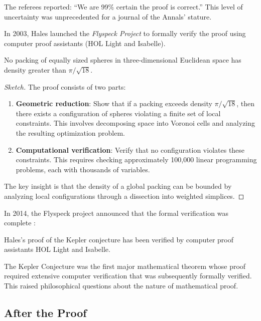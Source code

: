 The referees reported: ``We are 99\% certain the proof is correct.'' This level of uncertainty was unprecedented for a journal of the Annals' stature.

In 2003, Hales launched the \emph{Flyspeck Project} to formally verify the proof using computer proof assistants (HOL Light and Isabelle). 

\begin{theorem}
No packing of equally sized spheres in three-dimensional Euclidean space has density greater than $\pi/\sqrt{18}$.
\end{theorem}

\begin{proof}[Sketch]
The proof consists of two parts:
\begin{enumerate}
\item \textbf{Geometric reduction}: Show that if a packing exceeds density $\pi/\sqrt{18}$, then there exists a configuration of spheres violating a finite set of local constraints. This involves decomposing space into Voronoi cells and analyzing the resulting optimization problem.
\item \textbf{Computational verification}: Verify that no configuration violates these constraints. This requires checking approximately 100,000 linear programming problems, each with thousands of variables.
\end{enumerate}
The key insight is that the density of a global packing can be bounded by analyzing local configurations through a dissection into weighted simplices.
\end{proof}

In 2014, the Flyspeck project announced that the formal verification was complete \cite{hales2017}:

\begin{theorem}
Hales's proof of the Kepler conjecture has been verified by computer proof assistants HOL Light and Isabelle.
\end{theorem}

\begin{highlightbox}
The Kepler Conjecture was the first major mathematical theorem whose proof required extensive computer verification that was subsequently formally verified. This raised philosophical questions about the nature of mathematical proof.
\end{highlightbox}

\subsection{After the Proof}

